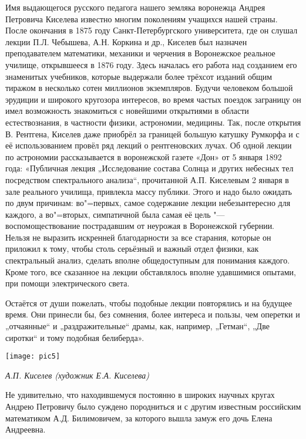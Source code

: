 Имя выдающегося русского педагога нашего земляка воронежца Андрея Петровича Киселева известно многим поколениям учащихся нашей страны. После окончания в 1875 году Санкт-Петербургского университета, где он слушал лекции П.Л. Чебышева, А.Н. Коркина и др., Киселев был назначен преподавателем математики, механики и черчения в Воронежское реальное училище, открывшееся в 1876 году. Здесь началась его работа над созданием его знаменитых учебников, которые выдержали более трёхсот изданий общим тиражом в несколько сотен миллионов экземпляров. Будучи человеком большой эрудиции и широкого кругозора интересов, во время частых поездок заграницу он имел возможность знакомиться с новейшими открытиями в области естествознания, в частности физики, астрономии, медицины. Так, после открытия В. Рентгена, Киселев даже приобрёл за границей большую катушку Румкорфа и с её использованием провёл ряд лекций о рентгеновских лучах. Об одной лекции по астрономии рассказывается в воронежской газете «Дон» от 5 января 1892 года: «Публичная лекция „Исследование состава Солнца и других небесных тел посредством спектрального анализа“, прочитанной А.П. Киселевым 2 января в зале реального училища, привлекла массу публики. Этого и надо было ожидать по двум причинам: во"=первых, самое содержание лекции небезынтересно для каждого, а во"=вторых, симпатичной была самая её цель "--- воспомоществование пострадавшим от неурожая в Воронежской губернии. Нельзя не выразить искренней благодарности за все старания, которые он приложил к тому, чтобы столь серьёзный и важный отдел физики, как спектральный анализ, сделать вполне общедоступным для понимания каждого. Кроме того, все сказанное на лекции обставлялось вполне удавшимися опытами, при помощи электрического света.

 Остаётся от души пожелать, чтобы подобные лекции повторялись и на будущее время. Они принесли бы, без сомнения, более интереса и пользы, чем оперетки и „отчаянные“ и „раздражительные“ драмы, как, например, „Гетман“, „Две сиротки“ и тому подобная белиберда».

\begin{center}
\texttt{[image: pic5]}

{\it А.П. Киселев (художник Е.А. Киселева)}
\end{center}


Не удивительно, что находившемуся постоянно в широких научных кругах Андрею Петровичу было суждено породниться и с другим известным российским математиком А.Д. Билимовичем, за которого вышла замуж его дочь Елена Андреевна.

